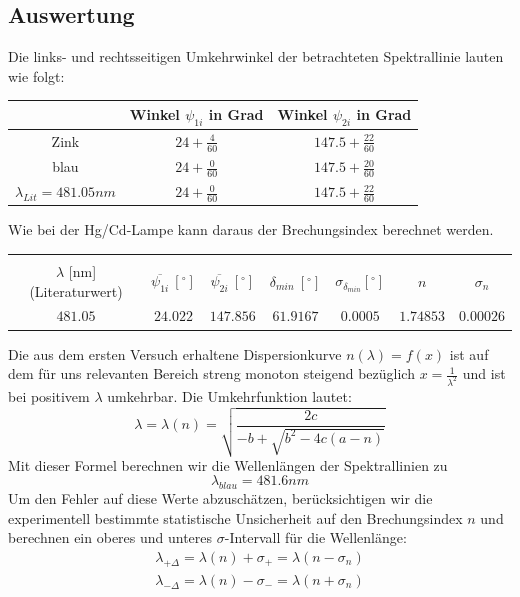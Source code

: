 \documentclass[12pt,a4paper]{article}
\begin{document}
\subsection{Auswertung}
Die links- und rechtsseitigen Umkehrwinkel der betrachteten Spektrallinie lauten wie folgt:
\begin{table}[H]
	\centering
	\begin{tabular}{|c|c|c|}
		\hline
		& Winkel $\psi_{1i}$ in Grad & Winkel $\psi_{2i}$ in Grad\\
		\hline
		Zink&$24+\frac{4}{60}$&$147.5+\frac{22}{60}$\\[0.1cm]
		blau&$24+\frac{0}{60}$&$147.5+\frac{20}{60}$\\[0.1cm]
		$\lambda_{Lit}=481.05nm$&$24+\frac{0}{60}$&$147.5+\frac{22}{60}$\\[0.1cm]
		\hline
	\end{tabular}
	\label{table:Winkel_Rohdaten_Zn}
\end{table}
Wie bei der Hg/Cd-Lampe kann daraus der Brechungsindex berechnet werden.
\begin{table}[H]
	\centering
	\begin{tabular}{|c|c|c|c|c|c|c|}
		\hline
		&&&&&&\\
		$\lambda$ [nm] (Literaturwert)&$\overline{\psi_{1i}}\ [^{\circ}]$&$\overline{\psi_{2i}}\ [^{\circ}]$&$\delta_{min}\ [^{\circ}]$&$\sigma_{\delta_{min}}[^{\circ}]$& $n$ & $\sigma_{n}$\\
		\hline
		$481.05$&$24.022$&$147.856$&$61.9167$&$0.0005$&$1.74853$&$0.00026$\\
		\hline
	\end{tabular}
	\label{table:Zn_Rechnung}
\end{table}
Die aus dem ersten Versuch erhaltene Dispersionkurve $n(\lambda)=f(x)$ ist auf dem für uns relevanten Bereich streng monoton steigend bezüglich $x=\frac{1}{\lambda^2}$ und ist bei positivem $\lambda$ umkehrbar. Die Umkehrfunktion lautet:
\begin{equation}
\lambda=\lambda(n)=\sqrt{\frac{2c}{-b+\sqrt{b^2-4c(a-n)}}}
\end{equation} 
Mit dieser Formel berechnen wir die Wellenlängen der Spektrallinien zu 
\begin{equation}
\lambda_{blau}=481.6nm
\end{equation}
Um den Fehler auf diese Werte abzuschätzen, berücksichtigen wir die experimentell bestimmte statistische Unsicherheit auf den Brechungsindex $n$ und berechnen ein oberes und unteres $\sigma$-Intervall für die Wellenlänge:
\begin{align}
\lambda_{+\Delta}=\lambda(n)+\sigma_{+}=\lambda(n-\sigma_n)\\
\lambda_{-\Delta}=\lambda(n)-\sigma_{-}=\lambda(n+\sigma_n)
\end{align}
\end{document}
